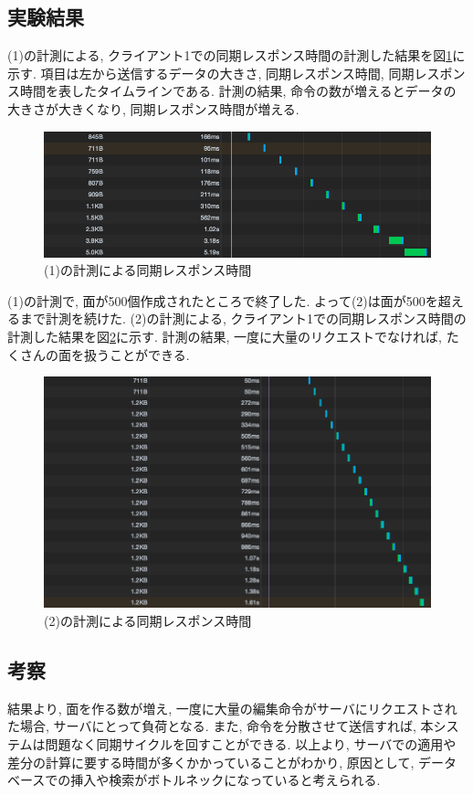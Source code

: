 \subsection{実験結果}
(1)の計測による, クライアント1での同期レスポンス時間の計測した結果を図\ref{jikken3}に示す.
項目は左から送信するデータの大きさ, 同期レスポンス時間, 同期レスポンス時間を表したタイムラインである. 計測の結果, 命令の数が増えるとデータの大きさが大きくなり, 同期レスポンス時間が増える.
\begin{figure}[htbp]
 \begin{center}
	 \includegraphics[scale=0.5]{images/jikken3}
	 \caption{(1)の計測による同期レスポンス時間}
	 \label{jikken3}
 \end{center}
\end{figure}
(1)の計測で, 面が500個作成されたところで終了した. よって(2)は面が500を超えるまで計測を続けた.
(2)の計測による, クライアント1での同期レスポンス時間の計測した結果を図\ref{jikken2}に示す.
計測の結果, 一度に大量のリクエストでなければ, たくさんの面を扱うことができる.
\begin{figure}[htbp]
 \begin{center}
	 \includegraphics[scale=0.5]{images/jikken2}
	 \caption{(2)の計測による同期レスポンス時間}
	 \label{jikken2}
 \end{center}
\end{figure}
\subsection{考察}
結果より, 面を作る数が増え, 一度に大量の編集命令がサーバにリクエストされた場合, サーバにとって負荷となる.
また, 命令を分散させて送信すれば, 本システムは問題なく同期サイクルを回すことができる.
以上より, サーバでの適用や差分の計算に要する時間が多くかかっていることがわかり, 原因として, データベースでの挿入や検索がボトルネックになっていると考えられる.
